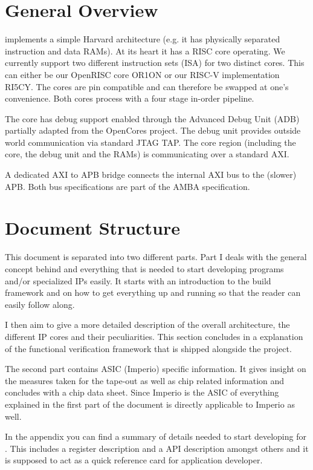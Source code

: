 \section{General Overview}

\pulpino implements a simple Harvard architecture (e.g. it has physically separated instruction and data RAMs). At its heart it
has a \gls{RISC} core operating. We currently support two different instruction sets (ISA) for two distinct cores. This can either be
our OpenRISC core OR1ON or our RISC-V implementation RI5CY. The cores are pin compatible and can therefore be swapped at one's
convenience. Both cores process with a four stage in-order pipeline.

The core has debug support enabled through the Advanced Debug Unit (ADB) partially adapted from the OpenCores project. The debug
unit provides outside world communication via standard JTAG TAP. The core region (including the core, the debug unit and the RAMs)
is communicating over a standard \gls{AXI}.

A dedicated AXI to APB bridge connects the internal AXI bus to the (slower) \gls{APB}. Both bus specifications are part of the
\gls{AMBA} specification.

\section{Document Structure}

This document is separated into two different parts. Part I deals with the general concept behind \pulpino and
everything that is needed to start developing programs and/or specialized IPs easily. It starts with an introduction to
the build framework and on how to get everything up and running so that the reader can easily follow along.

I then aim to give a more detailed description of the overall architecture, the different IP cores and their peculiarities.
This section concludes in a explanation of the functional verification framework that is shipped alongside the \pulpino project.

The second part contains ASIC (Imperio) specific information. It gives insight on the measures taken for the tape-out as
well as chip related information and concludes with a chip data sheet. Since Imperio is the ASIC of \pulpino everything explained in the
first part of the document is directly applicable to Imperio as well.

In the appendix you can find a summary of details needed to start developing for \pulpino. This includes a register description and
a API description amongst others and it is supposed to act as a quick reference card for application developer.


